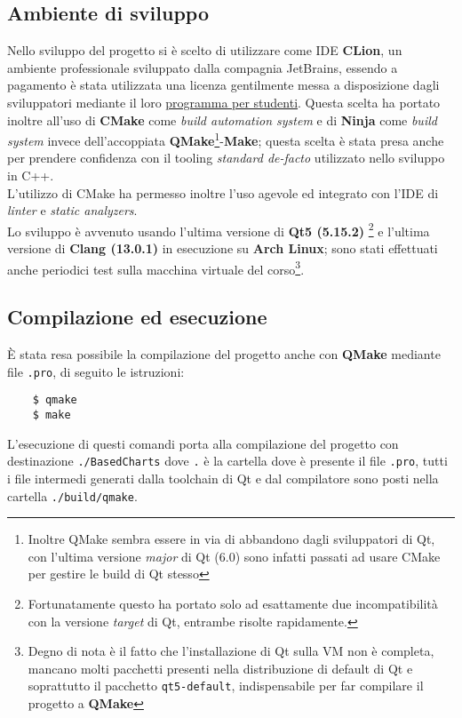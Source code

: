 \subsection{Ambiente di sviluppo}
Nello sviluppo del progetto si è scelto di utilizzare come IDE \textbf{CLion}, un ambiente professionale sviluppato
dalla compagnia JetBrains, essendo a pagamento è stata utilizzata una licenza gentilmente messa a disposizione dagli
sviluppatori mediante il loro \href{https://www.jetbrains.com/community/education/#students}{programma per studenti}.
Questa scelta ha portato inoltre all'uso di \textbf{CMake} come \textit{build automation system} e di \textbf{Ninja}
come \textit{build system} invece dell'accoppiata \textbf{QMake}\footnote{Inoltre QMake sembra essere in via di
abbandono dagli sviluppatori di Qt, con l'ultima versione \textit{major} di Qt (6.0) sono infatti passati ad usare CMake
per gestire le build di Qt stesso}-\textbf{Make}; questa scelta è stata presa anche per prendere confidenza con il tooling
\textit{standard de-facto} utilizzato nello sviluppo in C++.\\
L'utilizzo di CMake ha permesso inoltre l'uso agevole ed integrato con l'IDE di \textit{linter} e \textit{static
analyzers}.\\
Lo sviluppo è avvenuto usando l'ultima versione di \textbf{Qt5 (5.15.2)} \footnote{Fortunatamente questo ha portato solo
ad esattamente due incompatibilità con la versione \textit{target} di Qt, entrambe risolte rapidamente.} e l'ultima
versione di \textbf{Clang (13.0.1)} in esecuzione su \textbf{Arch Linux}; sono stati effettuati anche periodici test
sulla macchina virtuale del corso\footnote{Degno di nota è il fatto che l'installazione di Qt sulla VM non è
completa, mancano molti pacchetti presenti nella distribuzione di default di Qt e soprattutto il pacchetto
\texttt{qt5-default}, indispensabile per far compilare il progetto a \textbf{QMake}}.

\subsection{Compilazione ed esecuzione}
È stata resa possibile la compilazione del progetto anche con \textbf{QMake} mediante file \texttt{.pro}, di seguito
le istruzioni:
\begin{verbatim}
    $ qmake
    $ make
\end{verbatim}
L'esecuzione di questi comandi porta alla compilazione del progetto con destinazione \texttt{./BasedCharts} dove
\texttt{.} è la cartella dove è presente il file \texttt{.pro}, tutti i file intermedi generati dalla toolchain di Qt
e dal compilatore sono posti nella cartella \texttt{./build/qmake}.

